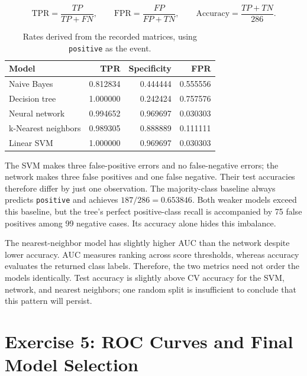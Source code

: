 \documentclass[11pt,a4paper]{article}
\begin{document}
\[
    \mathrm{TPR}=\frac{TP}{TP+FN},\qquad
    \mathrm{FPR}=\frac{FP}{FP+TN},\qquad
    \mathrm{Accuracy}=\frac{TP+TN}{286}.
\]
\begin{table}[htbp]\centering
    \begin{tabular}{lrrr}\toprule
        Model               & TPR      & Specificity & FPR      \\\midrule
        Naive Bayes         & 0.812834 & 0.444444    & 0.555556 \\
        Decision tree       & 1.000000 & 0.242424    & 0.757576 \\
        Neural network      & 0.994652 & 0.969697    & 0.030303 \\
        k-Nearest neighbors & 0.989305 & 0.888889    & 0.111111 \\
        Linear SVM          & 1.000000 & 0.969697    & 0.030303 \\\bottomrule
    \end{tabular}
    \caption{Rates derived from the recorded matrices, using \texttt{positive} as the event.}
\end{table}
The SVM makes three false-positive errors and no false-negative errors; the network makes three false positives and one false negative. Their test accuracies therefore differ by just one observation. The majority-class baseline always predicts \texttt{positive} and achieves $187/286=0.653846$. Both weaker models exceed this baseline, but the tree's perfect positive-class recall is accompanied by 75 false positives among 99 negative cases. Its accuracy alone hides this imbalance.

The nearest-neighbor model has slightly higher AUC than the network despite lower accuracy. AUC measures ranking across score thresholds, whereas accuracy evaluates the returned class labels. Therefore, the two metrics need not order the models identically. Test accuracy is slightly above CV accuracy for the SVM, network, and nearest neighbors; one random split is insufficient to conclude that this pattern will persist.

\section{Exercise 5: ROC Curves and Final Model Selection}
\end{document}
